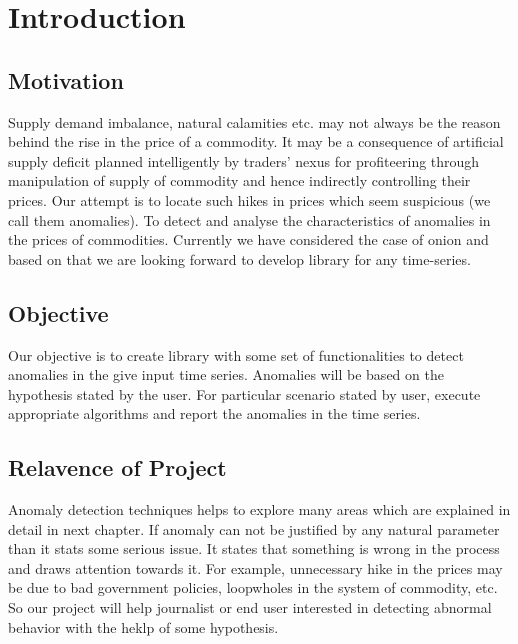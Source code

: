\chapter{Introduction}


\section{Motivation}

Supply demand imbalance, natural calamities etc. may not always be the reason behind the rise in the price of a commodity. ​It may be a consequence of artificial supply deficit planned intelligently by traders’ nexus for profiteering through manipulation of supply of commodity and hence indirectly controlling their prices. ​Our attempt is to locate such hikes in prices which seem suspicious (we call them anomalies).​ To detect and analyse the characteristics of anomalies in the prices of commodities. Currently we have considered the case of onion and based on that we are looking forward to develop library for any time-series.


\section{Objective}

Our objective is to create library with some set of functionalities to detect anomalies in the give input time series​. Anomalies will be based on the hypothesis stated by the user​. For particular scenario stated by user, execute appropriate algorithms and report the anomalies in the time series.


\section{Relavence of Project}

Anomaly detection techniques helps to explore many areas which are explained in detail in next chapter. If anomaly can not be justified by any natural parameter than it stats some serious issue. It states that something is wrong in the process and draws attention towards it. For example, unnecessary hike in the prices may be due to bad government policies, loopwholes in the system of commodity, etc. So our project will help journalist or end user interested in detecting abnormal behavior with the heklp of some hypothesis.

